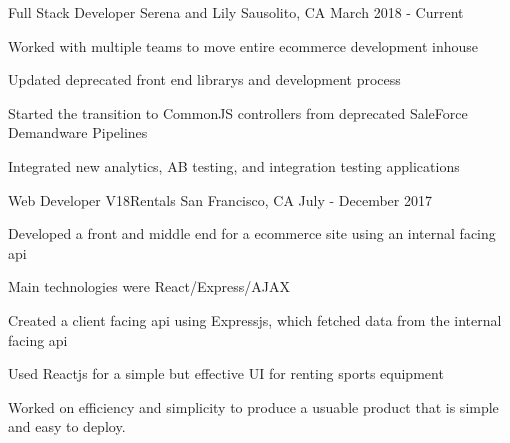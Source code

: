 

\begin{cventries}


  \cventry
    {Full Stack Developer} %
    {Serena and Lily} %
    {Sausolito, CA} %
    {March 2018 - Current} %
    {
      \begin{cvitems} %
        \item {Worked with multiple teams to move entire ecommerce development inhouse}
        \item {Updated deprecated front end librarys and development process}
        \item {Started the transition to CommonJS controllers from deprecated SaleForce Demandware Pipelines}
        \item {Integrated new analytics, AB testing, and integration testing applications}
      \end{cvitems}
    }

  \cventry
    {Web Developer} %
    {V18Rentals} %
    {San Francisco, CA} %
    {July - December 2017} %
    {
      \begin{cvitems} %
        \item {Developed a front and middle end for a ecommerce site using an internal facing api}
        \item {Main technologies were React/Express/AJAX}
        \item {Created a client facing api using Expressjs, which fetched data from the internal facing api}
        \item {Used Reactjs for a simple but effective UI for renting sports equipment}
        \item {Worked on efficiency and simplicity to produce a usuable product that is simple and easy to deploy.}
      \end{cvitems}
    }



\end{cventries}
